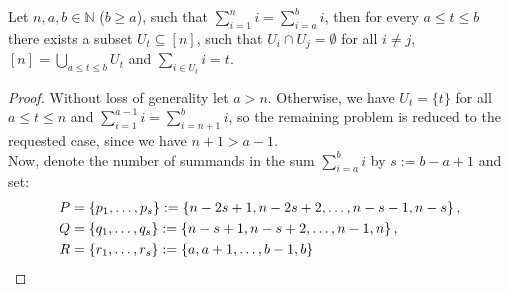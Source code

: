 \begin{thm}\label{theorem11}
Let \(n,a,b\in\mathbb{N}\) (\(b\geq a\)), such that \(\sum\limits_{i=1}^ni=\sum\limits_{i=a}^bi\), then for every \(a\leq t\leq b\) there exists a subset \(U_t\subseteq [n]\), such that \(U_i\cap U_j=\emptyset\) for all \(i\neq j\),\\
\([n]=\bigcup\limits_{a\leq t\leq b}U_t\) and \(\sum\limits_{i\in U_t}i=t\).
\begin{proof}
Without loss of generality let \(a>n\). Otherwise, we have \(U_t=\{t\}\) for all \(a\leq t\leq n\) and \(\sum\limits_{i=1}^{a-1}i=\sum\limits_{i=n+1}^bi\), so the remaining problem is reduced to the requested case, since we have \(n+1>a-1\).\\
Now, denote the number of summands in the sum \(\sum\limits_{i=a}^bi\) by \(s:=b-a+1\) and set:
\begin{align}
P&=\left\{p_1,\ldots,p_s\right\}:=\left\{n-2s+1,n-2s+2,\ldots,n-s-1,n-s\right\},\notag\\
Q&=\left\{q_1,\ldots,q_s\right\}:=\left\{n-s+1,n-s+2,\ldots,n-1,n\right\},\notag\\
R&=\left\{r_1,\ldots,r_s\right\}:=\left\{a,a+1,\ldots,b-1,b\right\}\notag
\end{align}

\end{proof}
\end{thm}

